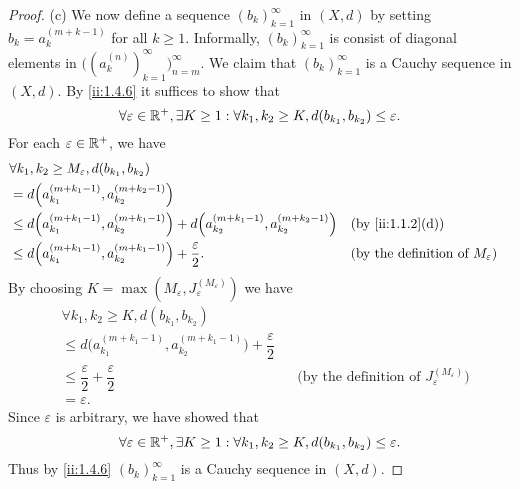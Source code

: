 \begin{proof}{(c)}
  We now define a sequence \((b_k)_{k = 1}^\infty\) in \((X, d)\) by setting \(b_k = a_k^{(m + k - 1)}\) for all \(k \geq 1\).
  Informally, \((b_k)_{k = 1}^\infty\) is consist of diagonal elements in \(\big((a_k^{(n)})_{k = 1}^\infty\big)_{n = m}^\infty\).
  We claim that \((b_k)_{k = 1}^\infty\) is a Cauchy sequence in \((X, d)\).
  By \cref{ii:1.4.6} it suffices to show that
  \[
    \forall \varepsilon \in \mathbb{R}^+, \exists K \geq 1 : \forall k_1, k_2 \geq K, d(b_{k_1}, b_{k_2}) \leq \varepsilon.
  \]
  For each \(\varepsilon \in \mathbb{R}^+\), we have
  \begin{align*}
     & \forall k_1, k_2 \geq M_\varepsilon, d(b_{k_1}, b_{k_2})                                                                                                                            \\
     & = d\Big(a_{k_1}^{(m + k_1 - 1)}, a_{k_2}^{(m + k_2 - 1)}\Big)                                                                                                                       \\
     & \leq d\Big(a_{k_1}^{(m + k_1 - 1)}, a_{k_2}^{(m + k_1 - 1)}\Big) + d\Big(a_{k_2}^{(m + k_1 - 1)}, a_{k_2}^{(m + k_2 - 1)}\Big) &  & \by{ii:1.1.2}[d]                                   \\
     & \leq d\Big(a_{k_1}^{(m + k_1 - 1)}, a_{k_2}^{(m + k_1 - 1)}\Big) + \dfrac{\varepsilon}{2}.                                     &  & \text{(by the definition of \(M_\varepsilon\))}
  \end{align*}
  By choosing \(K = \max(M_\varepsilon, J_\varepsilon^{(M_\varepsilon)})\) we have
  \begin{align*}
     & \forall k_1, k_2 \geq K, d(b_{k_1}, b_{k_2})                                                                                                                     \\
     & \leq d\Big(a_{k_1}^{(m + k_1 - 1)}, a_{k_2}^{(m + k_1 - 1)}\Big) + \dfrac{\varepsilon}{2}                                                                        \\
     & \leq \dfrac{\varepsilon}{2} + \dfrac{\varepsilon}{2}                                      &  & \text{(by the definition of \(J_\varepsilon^{(M_\varepsilon)}\))} \\
     & = \varepsilon.
  \end{align*}
  Since \(\varepsilon\) is arbitrary, we have showed that
  \[
    \forall \varepsilon \in \mathbb{R}^+, \exists K \geq 1 : \forall k_1, k_2 \geq K, d(b_{k_1}, b_{k_2}) \leq \varepsilon.
  \]
  Thus by \cref{ii:1.4.6} \((b_k)_{k = 1}^\infty\) is a Cauchy sequence in \((X, d)\).


\end{proof}
